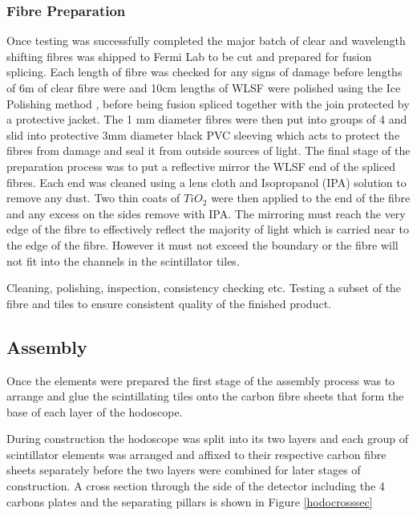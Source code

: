 \subsubsection*{Fibre Preparation}

Once testing was successfully completed the major batch of clear and wavelength shifting fibres was shipped to Fermi Lab to be cut and prepared for fusion splicing. Each length of fibre was checked for any signs of damage before lengths of 6m of clear fibre were and 10cm lengths of WLSF were polished using the Ice Polishing method \cite{gallas1998polishing}, before being fusion spliced together with the join protected by a protective jacket. The 1 mm diameter fibres were then put into groups of 4 and slid into protective 3mm diameter black PVC sleeving which acts to protect the fibres from damage and seal it from outside sources of light. The final stage of the preparation process was to put a reflective mirror the WLSF end of the spliced fibres. Each end was cleaned using a lens cloth and Isopropanol (IPA) solution to remove any dust. Two thin coats of $TiO_{2}$ were then applied to the end of the fibre and any excess on the sides remove with IPA. The mirroring must reach the very edge of the fibre to effectively reflect the majority of light which is carried near to the edge of the fibre. However it must not exceed the boundary or the fibre will not fit into the channels in the scintillator tiles.


Cleaning, polishing, inspection, consistency checking etc. Testing a subset of the fibre and tiles to ensure consistent quality of the finished product.
\cite{hanlet1999comparison}
\cite{gallas1998polishing}

\subsection{Assembly}

Once the elements were prepared the first stage of the assembly process was to arrange and glue the scintillating tiles onto the carbon fibre sheets that form the base of each layer of the hodoscope.

During construction the hodoscope was split into its two layers and each group of scintillator elements was arranged and affixed to their respective carbon fibre sheets separately before the two layers were combined for later stages of construction. A cross section through the side of the detector including the 4 carbons plates and the separating pillars is shown in Figure \ref{hodocrosssec}

